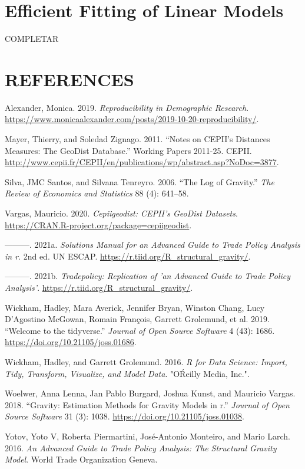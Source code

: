 \documentclass[12pt,reqno,oneside,pdftex]{formato-puc/puctesis} %
\newenvironment{CSLReferences}
  {}
  {\par}
\begin{document}
\chapter{Efficient Fitting of Linear Models}

COMPLETAR

\chapter*{REFERENCES}

\hypertarget{refs}{}
\begin{CSLReferences}{1}{0}
\leavevmode\hypertarget{ref-malexander19}{}%
Alexander, Monica. 2019. \emph{Reproducibility in Demographic Research}.
\url{https://www.monicaalexander.com/posts/2019-10-20-reproducibility/}.

\leavevmode\hypertarget{ref-CEPII201125}{}%
Mayer, Thierry, and Soledad Zignago. 2011. {``Notes on CEPII's Distances
Measures: The GeoDist Database.''} Working Papers 2011-25. CEPII.
\url{http://www.cepii.fr/CEPII/en/publications/wp/abstract.asp?NoDoc=3877}.

\leavevmode\hypertarget{ref-silva2006log}{}%
Silva, JMC Santos, and Silvana Tenreyro. 2006. {``The Log of Gravity.''}
\emph{The Review of Economics and Statistics} 88 (4): 641--58.

\leavevmode\hypertarget{ref-cepiigeodist}{}%
Vargas, Mauricio. 2020. \emph{Cepiigeodist: CEPII's GeoDist Datasets}.
\url{https://CRAN.R-project.org/package=cepiigeodist}.

\leavevmode\hypertarget{ref-solutionsagtpa}{}%
---------. 2021a. \emph{Solutions Manual for an Advanced Guide to Trade
Policy Analysis in r}. 2nd ed. UN ESCAP.
\url{https://r.tiid.org/R_structural_gravity/}.

\leavevmode\hypertarget{ref-tradepolicy}{}%
---------. 2021b. \emph{Tradepolicy: Replication of 'an Advanced Guide
to Trade Policy Analysis'}.
\url{https://r.tiid.org/R_structural_gravity/}.

\leavevmode\hypertarget{ref-tidyverse}{}%
Wickham, Hadley, Mara Averick, Jennifer Bryan, Winston Chang, Lucy
D'Agostino McGowan, Romain François, Garrett Grolemund, et al. 2019.
{``Welcome to the {tidyverse}.''} \emph{Journal of Open Source Software}
4 (43): 1686. \url{https://doi.org/10.21105/joss.01686}.

\leavevmode\hypertarget{ref-wickham2016r}{}%
Wickham, Hadley, and Garrett Grolemund. 2016. \emph{R for Data Science:
Import, Tidy, Transform, Visualize, and Model Data}. "OŔeilly Media,
Inc.".

\leavevmode\hypertarget{ref-Woelver2018}{}%
Woelwer, Anna Lenna, Jan Pablo Burgard, Joshua Kunst, and Mauricio
Vargas. 2018. {``Gravity: Estimation Methods for Gravity Models in r.''}
\emph{Journal of Open Source Software} 31 (3): 1038.
\url{https://doi.org/10.21105/joss.01038}.

\leavevmode\hypertarget{ref-yotov2016advanced}{}%
Yotov, Yoto V, Roberta Piermartini, José-Antonio Monteiro, and Mario
Larch. 2016. \emph{An Advanced Guide to Trade Policy Analysis: The
Structural Gravity Model}. World Trade Organization Geneva.

\end{CSLReferences}
\end{document}
